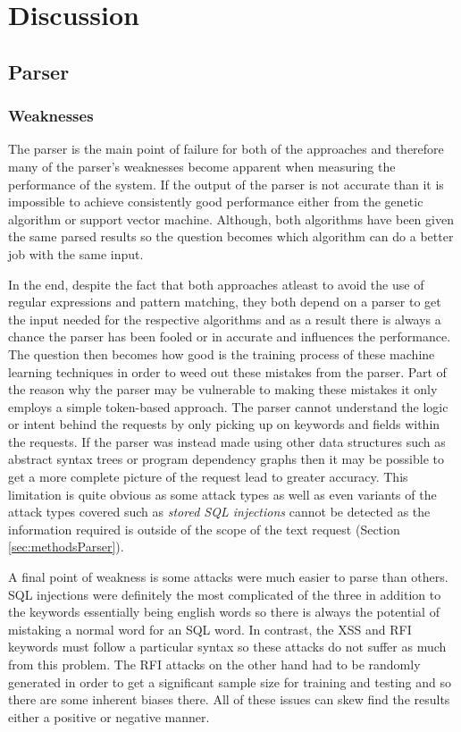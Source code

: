 \chapter{Discussion} \label{sec:sectionSeven}

\section{Parser}
\subsection{Weaknesses}\label{sec:parseWeak}

The parser is the main point of failure for both of the approaches and therefore many of the parser's weaknesses become apparent when measuring the performance of the system.  If the output of the parser is not accurate than it is impossible to achieve consistently good performance either from the genetic algorithm or support vector machine. Although, both algorithms have been given the same parsed results so the question becomes which algorithm can do a better job with the same input.  

In the end, despite the fact that both approaches atleast to avoid the use of regular expressions and pattern matching, they both depend on a parser to get the input needed for the respective algorithms and as a result there is always a chance the parser has been fooled or in accurate and influences the performance.  The question then becomes how good is the training process of these machine learning techniques in order to weed out these mistakes from the parser.  Part of the reason why the parser may be vulnerable to making these mistakes it only employs a simple token-based approach.  The parser cannot understand the logic or intent behind the requests by only picking up on keywords and fields within the requests.  If the parser was instead made using other data structures such as abstract syntax trees or program dependency graphs then it may be possible to get a more complete picture of the request lead to greater accuracy.  This limitation is quite obvious as some attack types as well as even variants of the attack types covered such as \textit{stored SQL injections} cannot be detected as the information required is outside of the scope of the text request (Section \ref{sec:methodsParser}). 

A final point of weakness is some attacks were much easier to parse than others.  SQL injections were definitely the most complicated of the three in addition to the keywords essentially being english words so there is always the potential of mistaking a normal word for an SQL word.  In contrast, the XSS and RFI keywords must follow a particular syntax so these attacks do not suffer as much from this problem.  The RFI attacks on the other hand had to be randomly generated in order to get a significant sample size for training and testing and so there are some inherent biases there.  All of these issues can skew find the results either a positive or negative manner.

